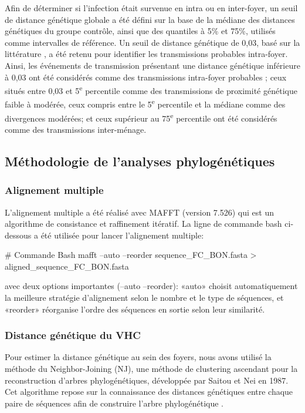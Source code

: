 \documentclass[a4paper,12pt]{article}
\begin{document}
Afin de déterminer si l’infection était survenue en intra ou en inter-foyer, un seuil de distance génétique globale a été défini sur la base de la médiane des distances génétiques du groupe contrôle, ainsi que des quantiles à 5\% et 75\%, utilisés comme intervalles de référence. Un seuil de distance génétique de 0,03, basé sur la littérature \cite{bartlettPatternsCorrelatesHepatitis2022,montoyaDeepSequencingIncreases2016}, a été retenu pour identifier les transmissions probables intra-foyer. Ainsi, les événements de transmission présentant une distance génétique inférieure à 0,03 ont été considérés comme des transmissions intra-foyer probables ; ceux situés entre 0,03 et 5\textsuperscript{e} percentile comme des transmissions de proximité génétique faible à modérée, ceux compris entre le 5\textsuperscript{e} percentile et la médiane comme des divergences modérées; et ceux supérieur au 75\textsuperscript{e} percentile ont été considérés comme des transmissions inter-ménage.
  

\subsection{Méthodologie de l'analyses phylogénétiques}
\subsubsection {Alignement multiple}

L’alignement multiple a été réalisé avec MAFFT (version 7.526) qui est un algorithme de consistance et raffinement itératif. La ligne de commande bash ci-dessous a été utilisée pour lancer l'alignement multiple:
\begin{terminal}
# Commande Bash 
 mafft --auto --reorder sequence_FC_BON.fasta > aligned_sequence_FC_BON.fasta
\end{terminal}
avec deux options importantes (--auto --reorder):  «auto» choisit automatiquement la meilleure stratégie d’alignement selon le nombre et le type de séquences, et «reorder» réorganise l’ordre des séquences en sortie selon leur similarité. 

\subsubsection {Distance génétique du VHC}
Pour estimer la distance génétique au sein des foyers, nous avons utilisé la méthode du Neighbor-Joining (NJ), une méthode de clustering ascendant pour la reconstruction d’arbres phylogénétiques, développée par Saitou et Nei en 1987. Cet algorithme repose sur la connaissance des distances génétiques entre chaque paire de séquences  afin de construire l’arbre phylogénétique \cite{NeighborJoining2026}.\\
\end{document}
